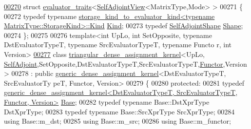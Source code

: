 \begin{DoxyCode}
\hyperlink{struct_eigen_1_1internal_1_1evaluator__traits_3_01_self_adjoint_view_3_01_matrix_type_00_01_mode_01_4_01_4}{00270} \textcolor{keyword}{struct }\hyperlink{struct_eigen_1_1internal_1_1evaluator__traits}{evaluator\_traits}<\hyperlink{group___core___module_class_eigen_1_1_self_adjoint_view}{SelfAdjointView}<MatrixType,Mode> >
00271 \{
00272   \textcolor{keyword}{typedef} \textcolor{keyword}{typename} 
      \hyperlink{struct_eigen_1_1internal_1_1_index_based}{storage\_kind\_to\_evaluator\_kind<typename MatrixType::StorageKind>::Kind}
       \hyperlink{struct_eigen_1_1internal_1_1_index_based}{Kind};
00273   \textcolor{keyword}{typedef} \hyperlink{struct_eigen_1_1_self_adjoint_shape}{SelfAdjointShape} \hyperlink{struct_eigen_1_1_self_adjoint_shape}{Shape};
00274 \};
00275 
00276 \textcolor{keyword}{template}<\textcolor{keywordtype}{int} UpLo, \textcolor{keywordtype}{int} SetOpposite, \textcolor{keyword}{typename} DstEvaluatorTypeT, \textcolor{keyword}{typename} SrcEvaluatorTypeT, \textcolor{keyword}{typename} Functo
      r, \textcolor{keywordtype}{int} Version>
\hyperlink{class_eigen_1_1internal_1_1triangular__dense__assignment__kernel_3_01_up_lo_00_01_self_adjoint_0bf432100a6648c0f02715a71126a9f44}{00277} \textcolor{keyword}{class }\hyperlink{class_eigen_1_1internal_1_1triangular__dense__assignment__kernel}{triangular\_dense\_assignment\_kernel}<UpLo,
      \hyperlink{group__enums_gga39e3366ff5554d731e7dc8bb642f83cda2491fc6765056421f504eb7e16083e8f}{SelfAdjoint},SetOpposite,DstEvaluatorTypeT,SrcEvaluatorTypeT,\hyperlink{struct_functor}{Functor},Version>
00278   : \textcolor{keyword}{public} \hyperlink{class_eigen_1_1internal_1_1generic__dense__assignment__kernel}{generic\_dense\_assignment\_kernel}<DstEvaluatorTypeT, SrcEvaluatorTy
      peT, Functor, Version>
00279 \{
00280 \textcolor{keyword}{protected}:
00281   \textcolor{keyword}{typedef} 
      \hyperlink{class_eigen_1_1internal_1_1generic__dense__assignment__kernel}{generic\_dense\_assignment\_kernel<DstEvaluatorTypeT, SrcEvaluatorTypeT, Functor, Version>}
       \hyperlink{class_eigen_1_1internal_1_1generic__dense__assignment__kernel}{Base};
00282   \textcolor{keyword}{typedef} \textcolor{keyword}{typename} Base::DstXprType DstXprType;
00283   \textcolor{keyword}{typedef} \textcolor{keyword}{typename} Base::SrcXprType SrcXprType;
00284   \textcolor{keyword}{using} Base::m\_dst;
00285   \textcolor{keyword}{using} Base::m\_src;
00286   \textcolor{keyword}{using} Base::m\_functor;

\end{DoxyCode}
